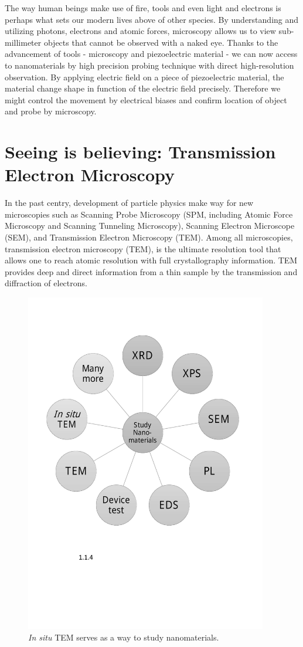 The way human beings make use of fire, tools and even light and electrons is perhaps what sets our modern lives above of other species. By understanding and utilizing photons, electrons and atomic forces, microscopy allows us to view sub-millimeter objects that cannot be observed with a naked eye. Thanks to the advancement of tools - microscopy and piezoelectric material - we can now access to nanomaterials by high precision probing technique with direct high-resolution observation. By applying electric field on a piece of piezoelectric material, the material change shape in function of the electric field precisely. Therefore we might control the movement by electrical biases and confirm location of object and probe by microscopy. 

\section{Seeing is believing: Transmission Electron Microscopy}
In the past centry, development of particle physics make way for new microscopies such as Scanning Probe Microscopy (SPM, including Atomic Force Microscopy and Scanning Tunneling Microscopy), Scanning Electron Microscope (SEM), and Transmission Electron Microscopy (TEM). Among all microscopies, transmission electron microscopy (TEM), is the ultimate resolution tool that allows one to reach atomic resolution with full crystallography information. TEM provides deep and direct information from a thin sample by the transmission and diffraction of electrons. 

\begin{figure}  
\centering
\includegraphics[width=300pt]{figures/figure1_to_study_nanomater.pdf}
\caption[To study nanomaterials]{{\em In situ} TEM serves as a way to study nanomaterials.
\label{fig:1tsn}}
\end{figure}

